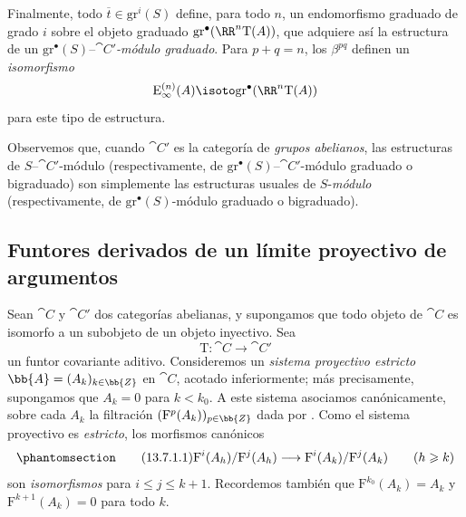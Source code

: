 \documentclass[oneside]{amsart}
\renewcommand{\leq}{\leqslant}
\renewcommand{\geq}{\geqslant}
\let\EGAOriginalLabel\label
\renewcommand{\label}[1]{\phantomsection\EGAOriginalLabel{#1}}
\begin{document}
\begin{env}[13.6.6]
Finalmente, todo $\overline{t}\in\mathrm{gr}^i(S)$ define, para todo
$n$, un endomorfismo graduado de grado $i$ sobre el objeto graduado
$\mathrm{gr}^\bullet(\RR^n\mathrm{T}(A))$, que adquiere así la
estructura de un
$\mathrm{gr}^\bullet(S)$--\emph{$\cat{C}'$-módulo graduado}.
Para $p+q=n$, los $\beta^{pq}$ definen un \emph{isomorfismo}
\[
  \mathrm E_\infty^{(n)}(A)
  \isoto
  \mathrm{gr}^\bullet(\RR^n\mathrm{T}(A))
\]
para este tipo de estructura.

Observemos que, cuando $\cat{C}'$ es la categoría de \emph{grupos abelianos}, las
estructuras de $S$--$\cat{C}'$-módulo (respectivamente, de
$\mathrm{gr}^\bullet(S)$--$\cat{C}'$-módulo graduado o bigraduado) son
simplemente las estructuras usuales de $S$-\emph{módulo} (respectivamente, de
$\mathrm{gr}^\bullet(S)$-módulo graduado o bigraduado).
\end{env}

\subsection{Funtores derivados de un límite proyectivo de argumentos}
\label{subsection:0.13.7}
\label{0.13.7}

\begin{env}[13.7.1]
\label{0.13.7.1}
Sean $\cat{C}$ y $\cat{C}'$ dos categorías abelianas, y supongamos
que todo objeto de $\cat{C}$ es isomorfo a un subobjeto de un
objeto inyectivo.
Sea
\[
  \mathrm{T}:\cat{C}\longrightarrow\cat{C}'
\]
un funtor covariante aditivo.
Consideremos un \emph{sistema proyectivo estricto}
$\bb{A}=(A_k)_{k\in\bb{Z}}$ en $\cat{C}$, acotado inferiormente; más
precisamente, supongamos que $A_k=0$ para $k<k_0$.
A este sistema asociamos canónicamente, sobre cada $A_k$ la
filtración $(\mathrm{F}^p(A_k))_{p\in\bb{Z}}$ dada por
.
Como el sistema proyectivo es \emph{estricto}, los morfismos canónicos
\begin{equation}
\label{0.13.7.1.1}
\tag{13.7.1.1}
  \mathrm{F}^i(A_h)/\mathrm{F}^j(A_h)
  \longrightarrow
  \mathrm{F}^i(A_k)/\mathrm{F}^j(A_k)
  \qquad(h\geq k)
\end{equation}
son \emph{isomorfismos} para $i\leq j\leq k+1$.
Recordemos también que
$\mathrm{F}^{k_0}(A_k)=A_k$ y
$\mathrm{F}^{k+1}(A_k)=0$ para todo $k$.
\end{env}
\end{document}
